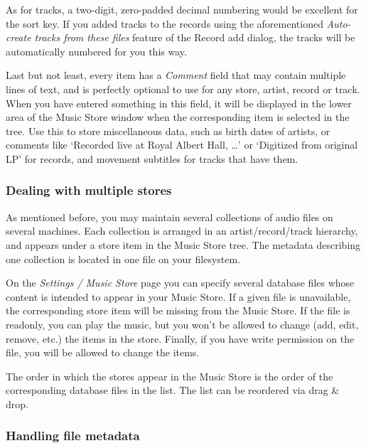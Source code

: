 \documentclass[10pt,english]{article}
\begin{document}
As for tracks, a two-digit, zero-padded decimal numbering
would be excellent for the sort key. If you added tracks to
the records using the aforementioned \textsl{Auto-create tracks
from these files} feature of the Record add dialog, the
tracks will be automatically numbered for you this way.




Last but not least, every item has a \textsl{Comment}
field that may contain multiple lines of text, and is
perfectly optional to use for any store, artist, record or
track. When you have entered something in this field, it
will be displayed in the lower area of the Music Store
window when the corresponding item is selected in the
tree. Use this to store miscellaneous data, such as birth
dates of artists, or comments like `Recorded live at Royal
Albert Hall, \dots{}' or `Digitized from original LP'
for records, and movement subtitles for tracks that have
them.




\subsubsection{Dealing with multiple stores\label{idp571856}}



\noindent As mentioned before, you may maintain several collections
of audio files on several machines. Each collection is
arranged in an artist/record/track hierarchy, and appears
under a store item in the Music Store tree. The metadata
describing one collection is located in one file on your
filesystem.




On the \textsl{Settings / Music Store} page you can
specify several database files whose content is intended to
appear in your Music Store. If a given file is unavailable,
the corresponding store item will be missing from the Music
Store. If the file is readonly, you can play the music, but
you won't be allowed to change (add, edit, remove, etc.) the
items in the store. Finally, if you have write permission on
the file, you will be allowed to change the items.




The order in which the stores appear in the Music Store
is the order of the corresponding database files in the
list. The list can be reordered via drag \& drop.




\subsubsection{Handling file metadata\label{idp575376}}
\end{document}
